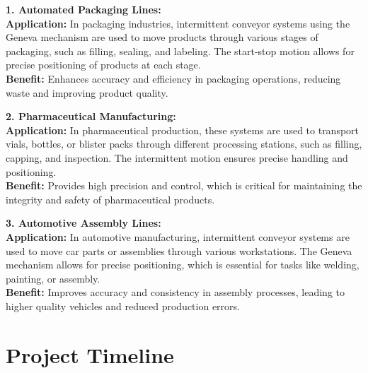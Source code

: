 \documentclass[a4paper,12pt]{article}
\begin{document}
\textbf{1. Automated Packaging Lines:}\\
\hspace*{4ex} \textbf{Application:} In packaging industries, intermittent conveyor systems using the Geneva mechanism are used to move products through various stages of packaging, such as filling, sealing, and labeling. The start-stop motion allows for precise positioning of products at each stage.\\
\hspace*{4ex} \textbf{Benefit:} Enhances accuracy and efficiency in packaging operations, reducing waste and improving product quality.

\textbf{2. Pharmaceutical Manufacturing:}\\
\hspace*{4ex} \textbf{Application:} In pharmaceutical production, these systems are used to transport vials, bottles, or blister packs through different processing stations, such as filling, capping, and inspection. The intermittent motion ensures precise handling and positioning.\\
\hspace*{4ex} \textbf{Benefit:} Provides high precision and control, which is critical for maintaining the integrity and safety of pharmaceutical products.

\textbf{3. Automotive Assembly Lines:}\\
\hspace*{4ex} \textbf{Application:} In automotive manufacturing, intermittent conveyor systems are used to move car parts or assemblies through various workstations. The Geneva mechanism allows for precise positioning, which is essential for tasks like welding, painting, or assembly.\\
\hspace*{4ex} \textbf{Benefit:} Improves accuracy and consistency in assembly processes, leading to higher quality vehicles and reduced production errors.

\section*{\centering \textbf{Project Timeline}}
\end{document}
